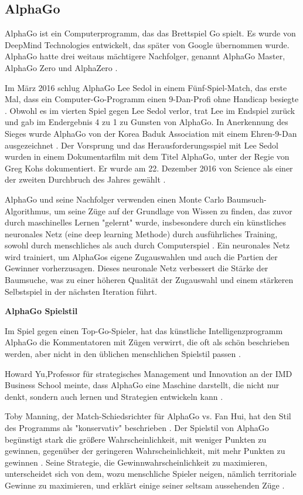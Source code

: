 \subsection{AlphaGo}
AlphaGo ist ein Computerprogramm, das das Brettspiel Go spielt\cite{BBC_NewsGo}. Es wurde von DeepMind Technologies entwickelt, das später von Google übernommen wurde. AlphaGo hatte drei weitaus mächtigere Nachfolger, genannt AlphaGo Master, AlphaGo Zero und AlphaZero \cite{DeepMind}.

Im März 2016 schlug AlphaGo Lee Sedol in einem Fünf-Spiel-Match, das erste Mal, dass ein Computer-Go-Programm einen 9-Dan-Profi ohne Handicap besiegte \cite{AlphaGoMatch}. Obwohl es im vierten Spiel gegen Lee Sedol verlor, trat Lee im Endspiel zurück und gab im Endergebnis 4 zu 1 zu Gunsten von AlphaGo. In Anerkennung des Sieges wurde AlphaGo von der Korea Baduk Association mit einem Ehren-9-Dan ausgezeichnet \cite{AlphaGoDan}. Der Vorsprung und das Herausforderungsspiel mit Lee Sedol wurden in einem Dokumentarfilm mit dem Titel AlphaGo, \cite{AlphaGoFilm} unter der Regie von Greg Kohs dokumentiert. Er wurde am 22. Dezember 2016 von Science als einer der zweiten Durchbruch des Jahres gewählt \cite{Science2016}.

AlphaGo und seine Nachfolger verwenden einen Monte Carlo Baumsuch-Algorithmus, um seine Züge auf der Grundlage von Wissen zu finden, das zuvor durch maschinelles Lernen "gelernt" wurde, insbesondere durch ein künstliches neuronales Netz (eine deep learning Methode) durch ausführliches Training, sowohl durch menschliches als auch durch Computerspiel \cite{Silver_2016}. Ein neuronales Netz wird trainiert, um AlphaGos eigene Zugauswahlen und auch die Partien der Gewinner vorherzusagen. Dieses neuronale Netz verbessert die Stärke der Baumsuche, was zu einer höheren Qualität der Zugauswahl und einem stärkeren Selbstspiel in der nächsten Iteration führt.

\textbf{AlphaGo Spielstil}

Im Spiel gegen einen Top-Go-Spieler, hat das künstliche Intelligenzprogramm AlphaGo die Kommentatoren mit Zügen verwirrt, die oft als \glqq schön\grqq{} beschrieben werden, aber nicht in den üblichen menschlichen Spielstil passen \cite{Ribeiro2016}.


Howard Yu,Professor für strategisches Management und Innovation an der IMD Business School meinte, dass AlphaGo  eine Maschine darstellt, die nicht nur denkt, sondern auch lernen und Strategien entwickeln kann \cite{Ribeiro2016}.

Toby Manning, der Match-Schiedsrichter für AlphaGo vs. Fan Hui, hat den Stil des Programms als "konservativ" beschrieben \cite{Gibney2016}. Der Spielstil von AlphaGo begünstigt stark die größere Wahrscheinlichkeit, mit weniger Punkten zu gewinnen, gegenüber der geringeren Wahrscheinlichkeit, mit mehr Punkten zu gewinnen \cite{Ribeiro2016}. Seine Strategie, die Gewinnwahrscheinlichkeit zu maximieren, unterscheidet sich von dem, wozu menschliche Spieler neigen, nämlich territoriale Gewinne zu maximieren, und erklärt einige seiner seltsam aussehenden Züge \cite{Chouard2016}.

